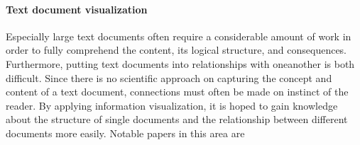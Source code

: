 \paragraph{Text document visualization}
Especially large text documents often require a considerable amount of work in order to fully comprehend the content, its logical structure, and consequences. Furthermore, putting text documents into relationships with oneanother is both difficult. Since there is no scientific approach on capturing the concept and content of a text document, connections must often be made on instinct of the reader. By applying information visualization, it is hoped to gain knowledge about the structure of single documents and the relationship between different documents more easily. Notable papers in this area are \cite{research:text:weber, research:text:huang, research:text:rohrer, research:text:wattenberg}